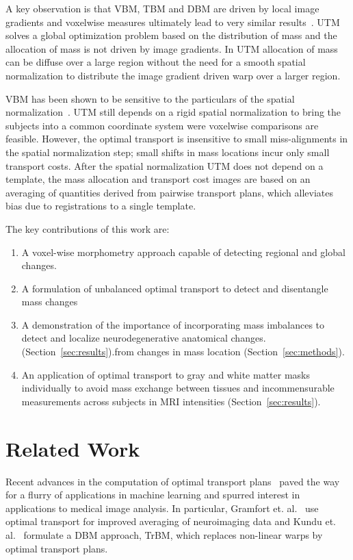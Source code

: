 \documentclass{llncs}
\begin{document}
A key observation is that VBM, TBM and DBM are driven by local image gradients
and voxelwise measures ultimately lead to very similar
results~\cite[Chaper~6]{frackowiak2004human}.  UTM solves a global optimization
problem based on the distribution of mass and the allocation of mass is not
driven by image gradients. In UTM allocation of mass can be diffuse over a
large region without the need for a smooth spatial normalization to distribute
the image gradient driven warp over a larger region. 

VBM has been shown to be sensitive to the particulars of the spatial
normalization~\cite{bookstein2001voxel,davatzikos2004voxel}. UTM still depends
on a rigid spatial normalization to bring the subjects into a common coordinate
system were voxelwise comparisons are feasible. However, the optimal transport
is insensitive to small miss-alignments in the spatial normalization step;
small shifts in mass locations incur only small transport costs.  After the
spatial normalization UTM does not depend on a template, the mass allocation
and transport cost images are based on an averaging of quantities derived from
pairwise transport plans, which alleviates bias due to registrations to a
single template. 

The key contributions of this work are:
\vspace{-1mm}
\begin{enumerate}
\item A voxel-wise morphometry approach capable of detecting regional and
  global changes.  
\item A formulation of unbalanced optimal transport to detect and disentangle mass
  changes 
\item A demonstration of the importance of incorporating mass imbalances to
  detect and localize neurodegenerative anatomical changes.
  (Section~\ref{sec:results}).from changes in mass location (Section~\ref{sec:methods}).
\item An application of optimal transport to gray and white matter masks
  individually to avoid mass exchange between tissues and incommensurable
  measurements across subjects in MRI intensities (Section~\ref{sec:results}).  
\end{enumerate}


\section{Related Work}
Recent advances in the computation of optimal transport
plans~\cite{cuturi2013sinkhorn,gerber2017multiscale} paved the way for a flurry
of applications in machine learning and spurred interest in applications to
medical image analysis. In particular, Gramfort et.
al.~\cite{gramfort2015fast} use optimal transport for improved averaging of
neuroimaging data and Kundu et.  al.~\cite{kundu2018discovery} formulate a DBM
approach, TrBM, which replaces non-linear warps by optimal transport plans. 
\end{document}

